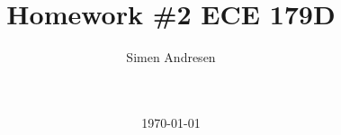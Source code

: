 \newcommand{\figurepath}{./figures/}
\newcommand{\figurescale}{0.6}
\newcommand{\codepath}{../matlab/}




\title{Homework \#2 ECE 179D}
\author{Simen Andresen}
\date{\ \\ \ \\ \today}




\maketitle


\pagestyle{fancy}
\lhead{}
\rhead{\thepage}
\setcounter{page}{1}

\rhead{\thepage}
\cfoot{}

%
%



